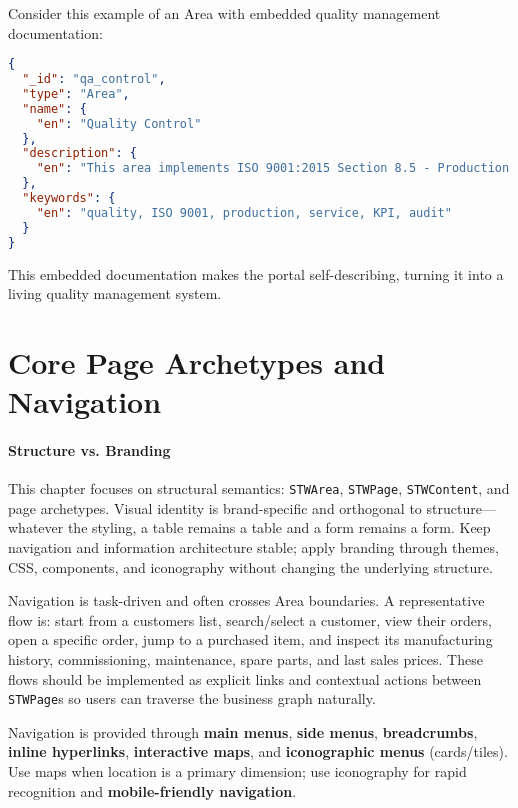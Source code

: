 Consider this example of an Area with embedded quality management documentation:

\begin{lstlisting}[language=JSON,caption={Area with Quality Management Documentation},label={lst:quality-area}]
{
  "_id": "qa_control",
  "type": "Area",
  "name": {
    "en": "Quality Control"
  },
  "description": {
    "en": "This area implements ISO 9001:2015 Section 8.5 - Production and Service Provision. All processes documented here follow our Quality Manual QM-2024-Rev3. Key Performance Indicators: Defect Rate < 0.1%, Customer Satisfaction > 95%."
  },
  "keywords": {
    "en": "quality, ISO 9001, production, service, KPI, audit"
  }
}
\end{lstlisting}

This embedded documentation makes the portal self-describing, turning it into a living quality management system.

\section{Core Page Archetypes and Navigation}
\label{sec:page-archetypes}

\paragraph{Structure vs. Branding}
This chapter focuses on structural semantics: \texttt{STWArea}, \texttt{STWPage}, \texttt{STWContent}, and page archetypes. Visual identity is brand-specific and orthogonal to structure—whatever the styling, a table remains a table and a form remains a form. Keep navigation and information architecture stable; apply branding through themes, CSS, components, and iconography without changing the underlying structure.

Navigation is task-driven and often crosses Area boundaries. A representative flow is:
start from a customers list, search/select a customer, view their orders, open a specific order, jump to a purchased item, and inspect its manufacturing history, commissioning, maintenance, spare parts, and last sales prices. These flows should be implemented as explicit links and contextual actions between \texttt{STWPage}s so users can traverse the business graph naturally.

Navigation is provided through \textbf{main menus}, \textbf{side menus}, \textbf{breadcrumbs}, \textbf{inline hyperlinks}, \textbf{interactive maps}, and \textbf{iconographic menus} (cards/tiles). Use maps when location is a primary dimension; use iconography for rapid recognition and \textbf{mobile-friendly navigation}.

